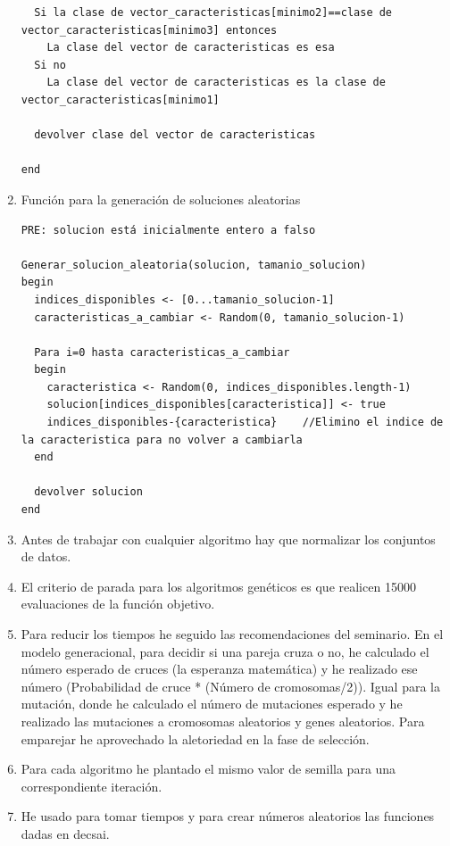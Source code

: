 \begin{enumerate}
\begin{lstlisting}
  Si la clase de vector_caracteristicas[minimo2]==clase de vector_caracteristicas[minimo3] entonces
    La clase del vector de caracteristicas es esa
  Si no
    La clase del vector de caracteristicas es la clase de vector_caracteristicas[minimo1]
    
  devolver clase del vector de caracteristicas
  
end
		\end{lstlisting}
		
		\item Función para la generación de soluciones aleatorias
\begin{lstlisting}
PRE: solucion está inicialmente entero a falso

Generar_solucion_aleatoria(solucion, tamanio_solucion)
begin
  indices_disponibles <- [0...tamanio_solucion-1]
  caracteristicas_a_cambiar <- Random(0, tamanio_solucion-1)
  
  Para i=0 hasta caracteristicas_a_cambiar
  begin
    caracteristica <- Random(0, indices_disponibles.length-1)
    solucion[indices_disponibles[caracteristica]] <- true
    indices_disponibles-{caracteristica}    //Elimino el indice de la caracteristica para no volver a cambiarla
  end
  
  devolver solucion
end

\end{lstlisting}
		
		\item Antes de trabajar con cualquier algoritmo hay que normalizar los conjuntos de datos.
		
		\item El criterio de parada para los algoritmos genéticos es que realicen 15000 evaluaciones de la función objetivo.
		
		\item Para reducir los tiempos he seguido las recomendaciones del seminario. En el modelo generacional, para decidir si una pareja cruza o no, he calculado el número esperado de cruces (la esperanza matemática) y he realizado ese número (Probabilidad de cruce * (Número de cromosomas/2)). Igual para la mutación, donde he calculado el número de mutaciones esperado y he realizado las mutaciones a cromosomas aleatorios y genes aleatorios. Para emparejar he aprovechado la aletoriedad en la fase de selección.
		
		
		\item Para cada algoritmo he plantado el mismo valor de semilla para una correspondiente iteración.
		
		\item He usado para tomar tiempos y para crear números aleatorios las funciones dadas en decsai.
	\end{enumerate}
	
